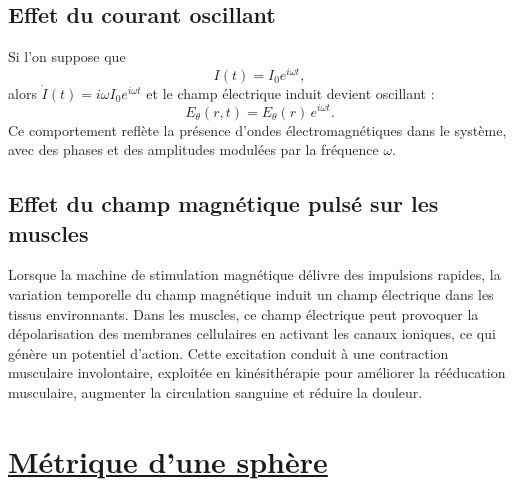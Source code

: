 \documentclass[a4paper,10pt]{report}
\begin{document}
	\subsection{Effet du courant oscillant}
	Si l'on suppose que
	\[
	I(t)= I_0 e^{i\omega t},
	\]
	alors $\dot{I}(t)= i\omega I_0 e^{i\omega t}$ et le champ électrique induit devient oscillant :
	\[
	E_\theta(r,t)= E_\theta(r) \, e^{i\omega t}.
	\]
	Ce comportement reflète la présence d'ondes électromagnétiques dans le système, avec des phases et des amplitudes modulées par la fréquence $\omega$.
	
	\subsection{Effet du champ magnétique pulsé sur les muscles}
	Lorsque la machine de stimulation magnétique délivre des impulsions rapides, la variation temporelle du champ magnétique induit un champ électrique dans les tissus environnants. Dans les muscles, ce champ électrique peut provoquer la dépolarisation des membranes cellulaires en activant les canaux ioniques, ce qui génère un potentiel d'action. Cette excitation conduit à une contraction musculaire involontaire, exploitée en kinésithérapie pour améliorer la rééducation musculaire, augmenter la circulation sanguine et réduire la douleur.
	
		\newpage \section{\hyperref[subsec:Schwarzschild]{Métrique d'une sphère}}\label{subsec:correctionSchwarzschild}
		 
\end{document}
